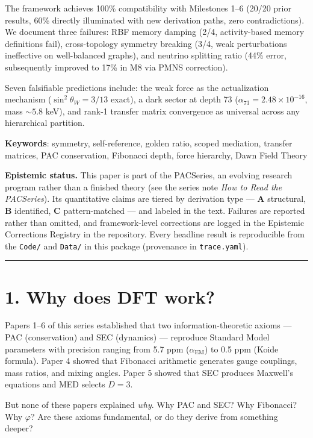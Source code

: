 \documentclass[11pt,a4paper]{article}
\begin{document}
The framework achieves 100\% compatibility with Milestones 1–6 (20/20 prior results, 60\% directly illuminated with new derivation paths, zero contradictions). We document three failures: RBF memory damping (2/4, activity-based memory definitions fail), cross-topology symmetry breaking (3/4, weak perturbations ineffective on well-balanced graphs), and neutrino splitting ratio (44\% error, subsequently improved to 17\% in M8 via PMNS correction).

Seven falsifiable predictions include: the weak force as the actualization mechanism ($\sin^2\theta_W = 3/13$ exact), a dark sector at depth 73 ($\alpha_{73} = 2.48 \times 10^{-16}$, mass $\sim 5.8$ keV), and rank-1 transfer matrix convergence as universal across any hierarchical partition.

\textbf{Keywords}: symmetry, self-reference, golden ratio, scoped mediation, transfer matrices, PAC conservation, Fibonacci depth, force hierarchy, Dawn Field Theory

\textbf{Epistemic status.} This paper is part of the PACSeries, an evolving research program rather than a finished theory (see the series note \emph{How to Read the PACSeries}). Its quantitative claims are tiered by derivation type — \textbf{A} structural, \textbf{B} identified, \textbf{C} pattern-matched — and labeled in the text. Failures are reported rather than omitted, and framework-level corrections are logged in the Epistemic Corrections Registry in the repository. Every headline result is reproducible from the \texttt{Code/} and \texttt{Data/} in this package (provenance in \texttt{trace.yaml}).

\begin{center}\rule{0.5\linewidth}{0.4pt}\end{center}

\section*{1. Why does DFT work?}

Papers 1–6 of this series established that two information-theoretic axioms — PAC (conservation) and SEC (dynamics) — reproduce Standard Model parameters with precision ranging from 5.7 ppm ($\alpha_{\text{EM}}$) to 0.5 ppm (Koide formula). Paper 4 showed that Fibonacci arithmetic generates gauge couplings, mass ratios, and mixing angles. Paper 5 showed that SEC produces Maxwell's equations and MED selects $D = 3$.

But none of these papers explained \emph{why}. Why PAC and SEC? Why Fibonacci? Why $\varphi$? Are these axioms fundamental, or do they derive from something deeper?
\end{document}
